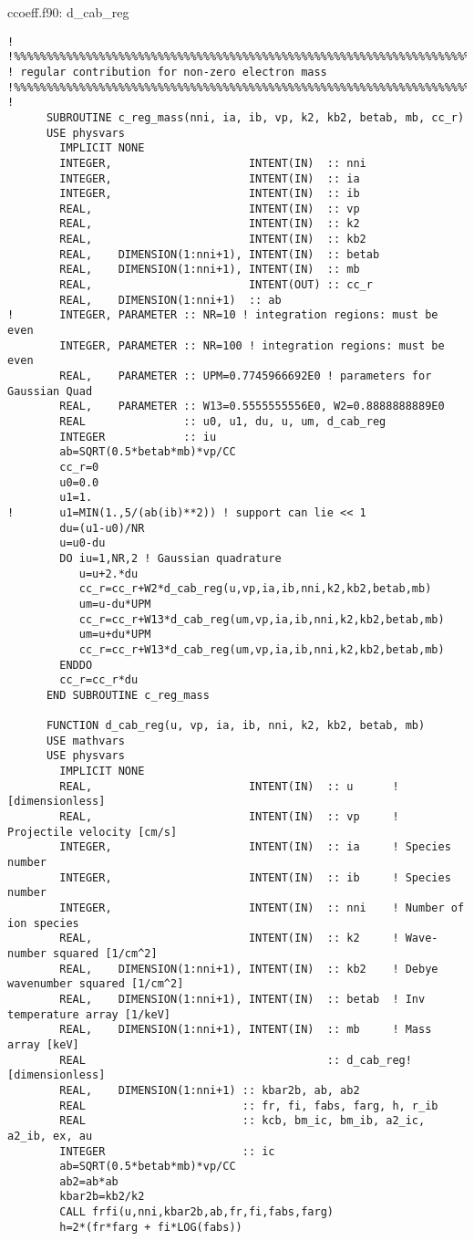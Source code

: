 \documentclass[preprint,12pt,eqsecnum,nofootinbib,amsmath,amssymb]{revtex4}
\begin{document}
{{\vskip0.4cm
\noindent
ccoeff.f90: d\_cab\_reg
{
\baselineskip 10pt
\begin{verbatim}
!
!%%%%%%%%%%%%%%%%%%%%%%%%%%%%%%%%%%%%%%%%%%%%%%%%%%%%%%%%%%%%%%%%%%%%%%%
! regular contribution for non-zero electron mass
!%%%%%%%%%%%%%%%%%%%%%%%%%%%%%%%%%%%%%%%%%%%%%%%%%%%%%%%%%%%%%%%%%%%%%%%
!
      SUBROUTINE c_reg_mass(nni, ia, ib, vp, k2, kb2, betab, mb, cc_r)
      USE physvars
        IMPLICIT NONE
        INTEGER,                     INTENT(IN)  :: nni 
        INTEGER,                     INTENT(IN)  :: ia
        INTEGER,                     INTENT(IN)  :: ib
        REAL,                        INTENT(IN)  :: vp
        REAL,                        INTENT(IN)  :: k2
        REAL,                        INTENT(IN)  :: kb2
        REAL,    DIMENSION(1:nni+1), INTENT(IN)  :: betab
        REAL,    DIMENSION(1:nni+1), INTENT(IN)  :: mb
        REAL,                        INTENT(OUT) :: cc_r
        REAL,    DIMENSION(1:nni+1)  :: ab
!       INTEGER, PARAMETER :: NR=10 ! integration regions: must be even
        INTEGER, PARAMETER :: NR=100 ! integration regions: must be even
        REAL,    PARAMETER :: UPM=0.7745966692E0 ! parameters for Gaussian Quad
        REAL,    PARAMETER :: W13=0.5555555556E0, W2=0.8888888889E0
        REAL               :: u0, u1, du, u, um, d_cab_reg
        INTEGER            :: iu
        ab=SQRT(0.5*betab*mb)*vp/CC
        cc_r=0
        u0=0.0
        u1=1.
!       u1=MIN(1.,5/(ab(ib)**2)) ! support can lie << 1
        du=(u1-u0)/NR
        u=u0-du
        DO iu=1,NR,2 ! Gaussian quadrature
           u=u+2.*du
           cc_r=cc_r+W2*d_cab_reg(u,vp,ia,ib,nni,k2,kb2,betab,mb)
           um=u-du*UPM
           cc_r=cc_r+W13*d_cab_reg(um,vp,ia,ib,nni,k2,kb2,betab,mb)
           um=u+du*UPM
           cc_r=cc_r+W13*d_cab_reg(um,vp,ia,ib,nni,k2,kb2,betab,mb)
        ENDDO
        cc_r=cc_r*du
      END SUBROUTINE c_reg_mass

      FUNCTION d_cab_reg(u, vp, ia, ib, nni, k2, kb2, betab, mb)
      USE mathvars
      USE physvars
        IMPLICIT NONE
        REAL,                        INTENT(IN)  :: u      ! [dimensionless]
        REAL,                        INTENT(IN)  :: vp     ! Projectile velocity [cm/s]
        INTEGER,                     INTENT(IN)  :: ia     ! Species number
        INTEGER,                     INTENT(IN)  :: ib     ! Species number
        INTEGER,                     INTENT(IN)  :: nni    ! Number of ion species
        REAL,                        INTENT(IN)  :: k2     ! Wave-number squared [1/cm^2]
        REAL,    DIMENSION(1:nni+1), INTENT(IN)  :: kb2    ! Debye wavenumber squared [1/cm^2]
        REAL,    DIMENSION(1:nni+1), INTENT(IN)  :: betab  ! Inv temperature array [1/keV]
        REAL,    DIMENSION(1:nni+1), INTENT(IN)  :: mb     ! Mass array [keV]
        REAL                                     :: d_cab_reg! [dimensionless]
        REAL,    DIMENSION(1:nni+1) :: kbar2b, ab, ab2
        REAL                        :: fr, fi, fabs, farg, h, r_ib
        REAL                        :: kcb, bm_ic, bm_ib, a2_ic, a2_ib, ex, au
        INTEGER                     :: ic
        ab=SQRT(0.5*betab*mb)*vp/CC
        ab2=ab*ab
        kbar2b=kb2/k2
        CALL frfi(u,nni,kbar2b,ab,fr,fi,fabs,farg)
        h=2*(fr*farg + fi*LOG(fabs))


\end{verbatim}}}}
\end{document}

